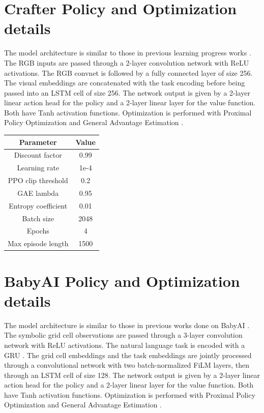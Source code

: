 \documentclass{article} %
\begin{document}
\section{Crafter Policy and Optimization details}
\label{app:policy-crafter}
The model architecture is similar to those in previous learning progress works \citep{ingmar}. The RGB inputs are passed through a 2-layer convolution network with ReLU activations. The RGB convnet is followed by a fully connected layer of size 256. The visual embeddings are concatenated with the task encoding before being passed into an LSTM cell of size 256. The network output is given by a 2-layer linear action head for the policy and a 2-layer linear layer for the value function. Both have Tanh activation functions. Optimization is performed with Proximal Policy Optimization \citep{ppo} and General Advantage Estimation \citep{gae}. 

\setlength{\tabcolsep}{3em}
\begin{table}[H]
\centering
\begin{tabular}{|c|c|}
\hline
\textbf{Parameter} & \textbf{Value} \\ \hline
Discount factor & 0.99 \\ \hline
Learning rate & 1e-4 \\ \hline
PPO clip threshold & 0.2 \\ \hline
GAE lambda & 0.95 \\ \hline
Entropy coefficient & 0.01 \\ \hline
Batch size & 2048 \\ \hline
Epochs & 4 \\ \hline
Max episode length & 1500 \\ \hline
\end{tabular}
\end{table}

\section{BabyAI Policy and Optimization details}
\label{app:policy-babyai}
The model architecture is similar to those in previous works done on BabyAI \citep{chevalier2018babyai}. The symbolic grid cell observations are passed through a 3-layer convolution network with ReLU activations. The natural language task is encoded with a GRU \citep{dey2017gate}. The grid cell embeddings and the task embeddings are jointly processed through a convolutional network with two batch-normalized FiLM \citep{perez2018film} layers, then through an LSTM cell of size 128. The network output is given by a 2-layer linear action head for the policy and a 2-layer linear layer for the value function. Both have Tanh activation functions. Optimization is performed with Proximal Policy Optimization \citep{ppo} and General Advantage Estimation \citep{gae}.
\end{document}
